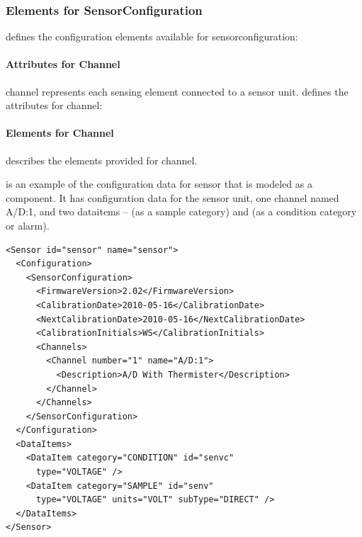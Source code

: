 

\subsubsection{Elements for SensorConfiguration}

 defines the configuration elements available for \gls{sensorconfiguration}:



\paragraph{Attributes for Channel}\mbox{}

\gls{channel} represents each \gls{sensing element} connected to a \gls{sensor unit}.  defines the attributes for \gls{channel}:



\paragraph{Elements for Channel}\mbox{}

 describes the elements provided for \gls{channel}.



 is an example of the configuration data for \gls{sensor} that is modeled as a \gls{component}.  It has \gls{configuration} data for the \gls{sensor unit}, one \gls{channel} named A/D:1, and two \gls{dataitems} –  (as a \gls{sample category}) and  (as a \gls{condition category} or alarm).

\begin{lstlisting}[firstnumber=1,escapechar=|,%
    caption={Example of configuration data for Sensor}, label={lst:example-of-sensor-configuration-data}]
<Sensor id="sensor" name="sensor">
  <Configuration>
    <SensorConfiguration>
      <FirmwareVersion>2.02</FirmwareVersion>
      <CalibrationDate>2010-05-16</CalibrationDate>
      <NextCalibrationDate>2010-05-16</NextCalibrationDate>
      <CalibrationInitials>WS</CalibrationInitials>
      <Channels>
        <Channel number="1" name="A/D:1">
          <Description>A/D With Thermister</Description>
        </Channel>
      </Channels>
    </SensorConfiguration>
  </Configuration>
  <DataItems>
    <DataItem category="CONDITION" id="senvc" 
      type="VOLTAGE" />
    <DataItem category="SAMPLE" id="senv" 
      type="VOLTAGE" units="VOLT" subType="DIRECT" />
  </DataItems>
</Sensor>
\end{lstlisting}


